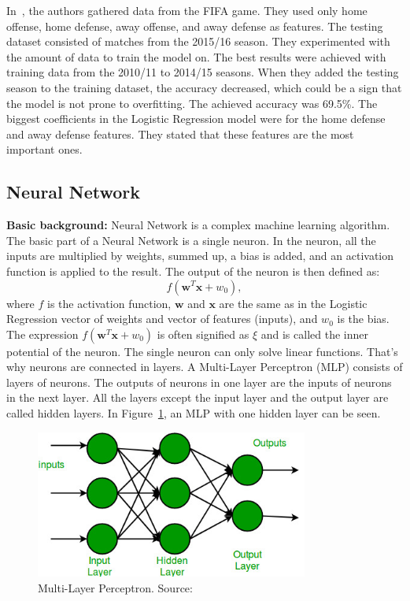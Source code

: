 \documentclass[thesis=M,english]{FITthesis}[2019/12/23]
\begin{document}
In~\cite{BPL_logistic_regression}, the authors gathered data from the FIFA game. They used only home offense, home defense, away offense, and away defense as features. The testing dataset consisted of matches from the 2015/16 season. They experimented with the amount of data to train the model on. The best results were achieved with training data from the 2010/11 to 2014/15 seasons. When they added the testing season to the training dataset, the accuracy decreased, which could be a sign that the model is not prone to overfitting. The achieved accuracy was 69.5\%. The biggest coefficients in the Logistic Regression model were for the home defense and away defense features. They stated that these features are the most important ones.

\subsection{Neural Network}
\textbf{Basic background:} Neural Network is a complex machine learning algorithm. The basic part of a Neural Network is a single neuron. In the neuron, all the inputs are multiplied by weights, summed up, a bias is added, and an activation function is applied to the result. The output of the neuron is then defined as: $$f(\boldsymbol{w}^T \boldsymbol{x} + w_0),$$ where $f$ is the activation function, $\boldsymbol{w}$ and $\boldsymbol{x}$ are the same as in the Logistic Regression vector of weights and vector of features (inputs), and $w_0$ is the bias. The expression $f(\boldsymbol{w}^T \boldsymbol{x} + w_0)$ is often signified as $\xi$ and is called the inner potential of the neuron. The single neuron can only solve linear functions. That's why neurons are connected in layers. A Multi-Layer Perceptron (MLP) consists of layers of neurons. The outputs of neurons in one layer are the inputs of neurons in the next layer. All the layers except the input layer and the output layer are called hidden layers. In Figure~\ref{fig:mlp}, an MLP with one hidden layer can be seen. 

\begin{figure}[h]
    \centering
    \includegraphics[width=0.8\textwidth]{figures/mlp.jpg}
    \caption{Multi-Layer Perceptron. Source: \cite{nn_pic}}
    \label{fig:mlp}
\end{figure}
\end{document}
